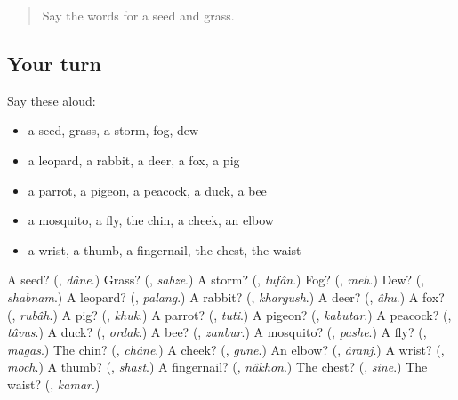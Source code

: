 \label{lesson:FA-R108-second-pass-nature-animals-and-the-body}



\begin{quote}
Say the words for a seed and grass.
\end{quote}

\subsection*{Your turn}
Say these aloud:

\begin{itemize}
\raggedright
  \item a seed, grass, a storm, fog, dew
  \item a leopard, a rabbit, a deer, a fox, a pig
  \item a parrot, a pigeon, a peacock, a duck, a bee
  \item a mosquito, a fly, the chin, a cheek, an elbow
  \item a wrist, a thumb, a fingernail, the chest, the waist
\end{itemize}

\begin{tcolorbox}[breakable,colback=teal!4,colframe=teal!35!black,title={Before you move on}]
A seed? (\textbf{}, \emph{dâne}.) Grass? (\textbf{}, \emph{sabze}.) A storm? (\textbf{}, \emph{tufân}.) Fog? (\textbf{}, \emph{meh}.) Dew? (\textbf{}, \emph{shabnam}.) A leopard? (\textbf{}, \emph{palang}.) A rabbit? (\textbf{}, \emph{khargush}.) A deer? (\textbf{}, \emph{âhu}.) A fox? (\textbf{}, \emph{rubâh}.) A pig? (\textbf{}, \emph{khuk}.) A parrot? (\textbf{}, \emph{tuti}.) A pigeon? (\textbf{}, \emph{kabutar}.) A peacock? (\textbf{}, \emph{tâvus}.) A duck? (\textbf{}, \emph{ordak}.) A bee? (\textbf{}, \emph{zanbur}.) A mosquito? (\textbf{}, \emph{pashe}.) A fly? (\textbf{}, \emph{magas}.) The chin? (\textbf{}, \emph{châne}.) A cheek? (\textbf{}, \emph{gune}.) An elbow? (\textbf{}, \emph{âranj}.) A wrist? (\textbf{}, \emph{moch}.) A thumb? (\textbf{}, \emph{shast}.) A fingernail? (\textbf{}, \emph{nâkhon}.) The chest? (\textbf{}, \emph{sine}.) The waist? (\textbf{}, \emph{kamar}.)
\end{tcolorbox}

